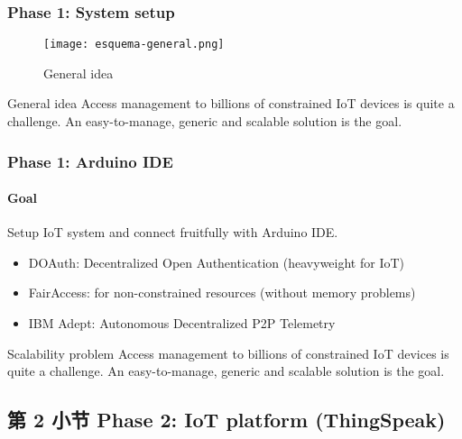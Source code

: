 \documentclass[
    aspectratio=169,                   %
]{beamer}
\begin{document}
    \begin{frame}
        \frametitle{Phase 1: System setup}

        \begin{figure}
            \centering
            \begin{stampbox}
                \texttt{[image: esquema-general.png]}
            \end{stampbox}
            \caption{General idea}
        \end{figure}
        
        \begin{block}{General idea}
            Access management to billions of constrained IoT devices is quite a challenge. An easy-to-manage, generic and scalable solution is the goal.
        \end{block}

    \end{frame}

    \begin{frame}
        \frametitle{Phase 1: Arduino IDE}
        
        \paragraph{Goal} Setup IoT system and connect fruitfully with Arduino IDE.\cite{ouaddah}

        \begin{itemize}
            \item \alert{DOAuth}: Decentralized Open Authentication (heavyweight for IoT)
            \item \alert{FairAccess}: for non-constrained resources (without memory problems)
            \item \alert{IBM Adept}: Autonomous Decentralized P2P Telemetry
        \end{itemize}

        \begin{block}{Scalability problem}
            Access management to billions of constrained IoT devices is quite a challenge. An easy-to-manage, generic and scalable solution is the goal.
        \end{block}
    \end{frame}

\subsection{第 2 小节 Phase 2: IoT platform (ThingSpeak)}
\end{document}
